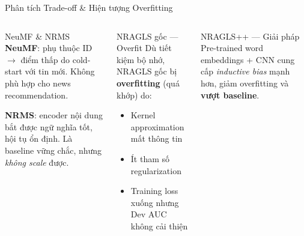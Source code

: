 \documentclass[aspectratio=169,11pt]{beamer}
\newcommand{\hl}[1]{\textcolor{accentorange}{\textbf{#1}}}
\begin{document}
\begin{frame}{Phân tích Trade-off \& Hiện tượng Overfitting}
  \begin{columns}[T]
      \begin{block}{NeuMF \& NRMS}
        \textbf{NeuMF}: phụ thuộc ID $\to$ điểm thấp
        do cold-start với tin mới.
        Không phù hợp cho news recommendation.

        \vspace{0.3em}
        \textbf{NRMS}: encoder nội dung bắt được
        ngữ nghĩa tốt, hội tụ ổn định.
        Là baseline vững chắc, nhưng \textit{không scale} được.
      \end{block}

      \begin{alertblock}{NRAGLS gốc --- Overfit}
        Dù tiết kiệm bộ nhớ, NRAGLS gốc
        bị \textbf{overfitting} (quá khớp) do:
        \begin{itemize}
          \item Kernel approximation mất thông tin
          \item Ít tham số regularization
          \item Training loss xuống nhưng
            Dev AUC không cải thiện
        \end{itemize}
      \end{alertblock}
      \vspace{0.3em}
      \begin{exampleblock}{NRAGLS++ --- Giải pháp}
        Pre-trained word embeddings + CNN
        cung cấp \textit{inductive bias} mạnh hơn,
        giảm overfitting và \hl{vượt baseline}.
      \end{exampleblock}
  \end{columns}
\end{frame}
\end{document}
